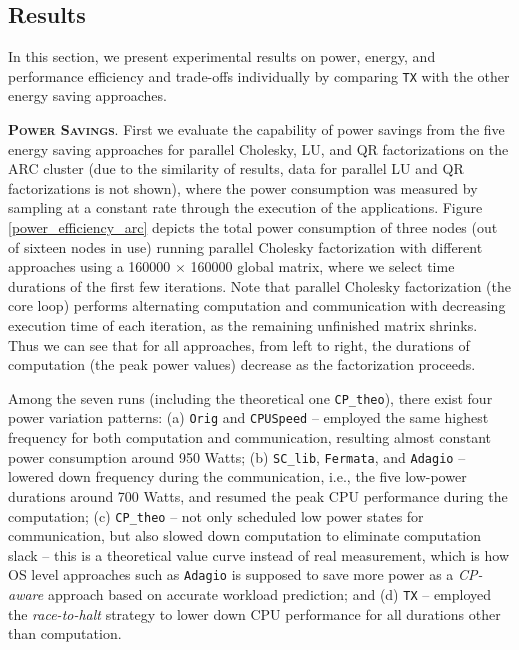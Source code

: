 \documentclass[12pt]{elsarticle}
\begin{document}
\subsection{Results}

In this section, we present experimental results on power, energy, and performance efficiency and trade-offs individually by comparing \texttt{TX} with the other energy saving approaches.

\vspace{1mm}
\noindent\textsc{\textbf{Power Savings}}. First we evaluate the capability of power savings from the five energy saving approaches for parallel Cholesky, LU, and QR factorizations on the ARC cluster (due to the similarity of results, data for parallel LU and QR factorizations is not shown), where the power consumption was measured by sampling at a constant rate through the execution of the applications. Figure \ref{power_efficiency_arc} depicts the total power consumption of three nodes (out of sixteen nodes in use) running parallel Cholesky factorization with different approaches using a 160000 $\times$ 160000 global matrix, where we select time durations of the first few iterations. Note that parallel Cholesky factorization (the core loop) performs alternating computation and communication with decreasing execution time of each iteration, as the remaining unfinished matrix shrinks. Thus we can see that for all approaches, from left to right, the durations of computation (the peak power values) decrease as the factorization proceeds.

Among the seven runs (including the theoretical one \texttt{CP\_theo}), there exist four power variation patterns: (a) \texttt{Orig} and \texttt{CPUSpeed} -- employed the same highest frequency for both computation and communication, resulting almost constant power consumption around 950 Watts; (b) \texttt{SC\_lib}, \texttt{Fermata}, and \texttt{Adagio} -- lowered down frequency during the communication, i.e., the five low-power durations around 700 Watts, and resumed the peak CPU performance during the computation; (c) \texttt{CP\_theo} -- not only scheduled low power states for communication, but also slowed down computation to eliminate computation slack -- this is a theoretical value curve instead of real measurement, which is how OS level approaches such as \texttt{Adagio} is supposed to save more power as a \emph{CP-aware} approach based on accurate workload prediction; and (d) \texttt{TX} -- employed the \emph{race-to-halt} strategy to lower down CPU performance for all durations other than computation.
\end{document}

